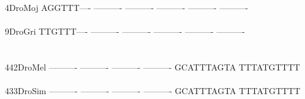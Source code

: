 \documentclass[11pt,twoside,reqno,a4paper]{article}
\begin{document}
{4\hspace*{4\charwidth}DroMoj	AGGTTT----	----------	----------	----------	----------	----------	\\
\hspace*{5\charwidth}\hspace*{7\charwidth}\hspace*{1\charwidth}\hspace*{1\charwidth}\hspace*{1\charwidth}\hspace*{1\charwidth}\hspace*{1\charwidth}\hspace*{1\charwidth}\\
9\hspace*{4\charwidth}DroGri	TTGTTT----	----------	----------	----------	----------	----------	\\
\hspace*{5\charwidth}\hspace*{7\charwidth}\hspace*{1\charwidth}\hspace*{1\charwidth}\hspace*{1\charwidth}\hspace*{1\charwidth}\hspace*{1\charwidth}\hspace*{1\charwidth}\\
\\
442\hspace*{2\charwidth}DroMel	----------	----------	----------	----------	GCATTTAGTA	TTTATGTTTT	\\
\hspace*{5\charwidth}\hspace*{7\charwidth}\hspace*{1\charwidth}\hspace*{1\charwidth}\hspace*{1\charwidth}\hspace*{1\charwidth}\hspace*{1\charwidth}\hspace*{1\charwidth}\\
433\hspace*{2\charwidth}DroSim	----------	----------	----------	----------	GCATTTAGTA	TTTATGTTTT	\\
\hspace*{5\charwidth}\hspace*{7\charwidth}\hspace*{1\charwidth}\hspace*{1\charwidth}\hspace*{1\charwidth}\hspace*{1\charwidth}\hspace*{1\charwidth}\hspace*{1\charwidth}\\
}
\end{document}

